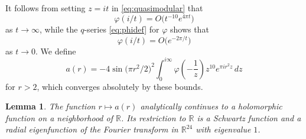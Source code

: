 \documentclass{aomart}
\theoremstyle{plain}
\newtheorem{lemma}[theorem]{Lemma}
\numberwithin{theorem}{section}
\numberwithin{equation}{section}
\newcommand{\R}{{\mathbb R}}
\begin{document}
It follows from setting $z=it$ in \eqref{eq:quasimodular} that
\begin{equation} \label{eq:phiovertinfty}
\varphi(i/t) = O\big(t^{-10} e^{4\pi t}\big)
\end{equation}
as $t \to \infty$, while the $q$-series \eqref{eq:phidef} for $\varphi$ shows
that
\begin{equation} \label{eq:phiovertzero}
\varphi(i/t) = O\big(e^{-2\pi/t}\big)
\end{equation}
as $t \to 0$.  We define
\begin{equation} \label{eq:adef}
a(r) = - 4 \sin\mathopen{}\big(\pi r^2/2\big)^2\mathclose{} \int_0^{i \infty} \varphi\mathopen{}\left(-\frac{1}{z}\right)\mathclose{} z^{10} e^{\pi i r^2 z} \, dz
\end{equation}
for $r>2$, which converges absolutely by these bounds.

\begin{lemma} \label{lemma:plusone}
The function $r \mapsto a(r)$ analytically continues to a holomorphic
function on a neighborhood of $\R$.  Its restriction to $\R$ is a Schwartz
function and a radial eigenfunction of the Fourier transform in $\R^{24}$
with eigenvalue $1$.
\end{lemma}
\end{document}
